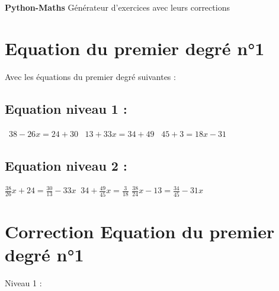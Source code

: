 \documentclass{article}%
\begin{document}
%
\normalsize%
\pagestyle{header}%
\begin{minipage}{\textwidth}%
\centering%
\vspace*{200pt}%
\fontsize{50}{36}%
\selectfont%
\textbf{Python{-}Maths}%
\linebreak%
\fontsize{30}{24}%
\selectfont%
Générateur d'exercices avec leurs corrections%
\end{minipage}%
\newpage%
\fontsize{12}{10}%
\selectfont%
\section*{Equation du premier degré n°1}%
\label{sec:Equationdupremierdegrn1}%
Avec les équations du premier degré suivantes : %
\subsection*{Equation niveau 1 : }%
\label{subsec:Equationniveau1}%
\ $38 - 26x = 24 + 30 $%
\vspace{5mm}%
\newline%
\ $13 + 33x  = 34 + 49$%
\vspace{5mm}%
\newline%
\ $45 + 3 = 18x - 31$

%
\subsection*{Equation niveau 2 : }%
\label{subsec:Equationniveau2}%
$\frac{38}{26}x + 24 = \frac{30}{13} - 33x$%
\vspace{5mm}%
\newline%
$\ 34 + \frac{49}{45}x = \frac{3}{18}$%
\vspace{5mm}%
\newline%
$\frac{38}{24}x - 13 = \frac{34}{45} - 31x$%
\vspace{5mm}%
\newline

%
\newpage%
\section*{Correction Equation du premier degré n°1}%
\label{sec:CorrectionEquationdupremierdegrn1}%
Niveau 1 :%
\end{document}
